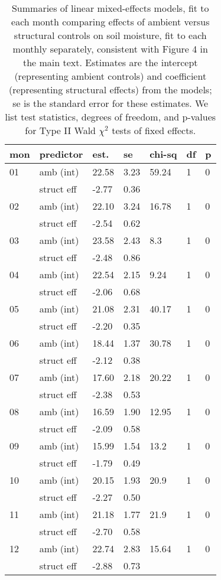 \documentclass{article}
\begin{document}
\begin{table}[ht]
\centering
\caption{Summaries of linear mixed-effects models, fit to each month comparing effects of ambient versus structural controls on soil moisture, fit to each monthly separately, consistent with Figure 4 in the main text. Estimates are the intercept (representing ambient controls) and coefficient (representing structural effects) from the models; se is the standard error for these estimates. We list test statistics, degrees of freedom, and p-values for Type II Wald $\chi^{2}$ tests of fixed effects.} 
\label{table:shamamb_soilmoism}
\begin{tabular}{|p{}|p{}|p{}p{}p{}p{}p{}|}
  \hline
mon & predictor & est. & se & chi-sq & df & p \\ 
  \hline
01 & amb (int) & 22.58 & 3.23 & 59.24 & 1 & 0 \\ 
    & struct eff & -2.77 & 0.36 &  &  &  \\ 
   \hline
02 & amb (int) & 22.10 & 3.24 & 16.78 & 1 & 0 \\ 
    & struct eff & -2.54 & 0.62 &  &  &  \\ 
   \hline
03 & amb (int) & 23.58 & 2.43 & 8.3 & 1 & 0 \\ 
    & struct eff & -2.48 & 0.86 &  &  &  \\ 
   \hline
04 & amb (int) & 22.54 & 2.15 & 9.24 & 1 & 0 \\ 
    & struct eff & -2.06 & 0.68 &  &  &  \\ 
   \hline
05 & amb (int) & 21.08 & 2.31 & 40.17 & 1 & 0 \\ 
    & struct eff & -2.20 & 0.35 &  &  &  \\ 
   \hline
06 & amb (int) & 18.44 & 1.37 & 30.78 & 1 & 0 \\ 
    & struct eff & -2.12 & 0.38 &  &  &  \\ 
   \hline
07 & amb (int) & 17.60 & 2.18 & 20.22 & 1 & 0 \\ 
    & struct eff & -2.38 & 0.53 &  &  &  \\ 
   \hline
08 & amb (int) & 16.59 & 1.90 & 12.95 & 1 & 0 \\ 
    & struct eff & -2.09 & 0.58 &  &  &  \\ 
   \hline
09 & amb (int) & 15.99 & 1.54 & 13.2 & 1 & 0 \\ 
    & struct eff & -1.79 & 0.49 &  &  &  \\ 
   \hline
10 & amb (int) & 20.15 & 1.93 & 20.9 & 1 & 0 \\ 
    & struct eff & -2.27 & 0.50 &  &  &  \\ 
   \hline
11 & amb (int) & 21.18 & 1.77 & 21.9 & 1 & 0 \\ 
    & struct eff & -2.70 & 0.58 &  &  &  \\ 
   \hline
12 & amb (int) & 22.74 & 2.83 & 15.64 & 1 & 0 \\ 
    & struct eff & -2.88 & 0.73 &  &  &  \\ 
   \hline
\end{tabular}
\end{table}\clearpage
\end{document}
